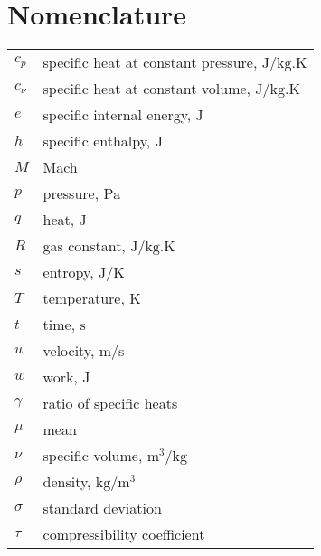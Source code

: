 \documentclass[main]{subfiles}
\begin{document}
\section{Nomenclature}

{\renewcommand\arraystretch{1.0}
		\noindent\begin{longtable}{@{}l @{\quad=\quad} l@{}}

			$c_p$ & specific heat at constant pressure, $\unit{\joule/\kilogram.\kelvin}$\\
			$c_\nu$ & specific heat at constant volume, $\unit{\joule/\kilogram.\kelvin}$\\
			$e$ & specific internal energy, $\unit{\joule}$\\
			$h$ & specific enthalpy, $\unit{\joule}$ \\
			$M$ & Mach \\
			$p$  & pressure, $\unit{\pascal}$ \\
			$q$ & heat, $\unit{\joule}$\\
			$R$ & gas constant, $\unit{\joule/\kilogram.\kelvin}$ \\
			$s$ & entropy, $\unit{\joule/\kelvin}$\\
			$T$ & temperature, $\unit{\kelvin}$\\
			$t$ & time, $\unit{\second}$\\
			$u$& velocity, $\unit{\meter/\second}$ \\
			$w$ & work, $\unit{\joule}$\\
			$\gamma$ & ratio of specific heats\\
			$\mu$ & mean\\
			$\nu$ & specific volume, $\unit{\meter^3/\kilogram}$\\
			$\rho$ & density, $\unit{\kilogram/\meter^3}$ \\
			$\sigma$ & standard deviation\\
			$\tau$ & compressibility coefficient 
	\end{longtable}}
\end{document}
